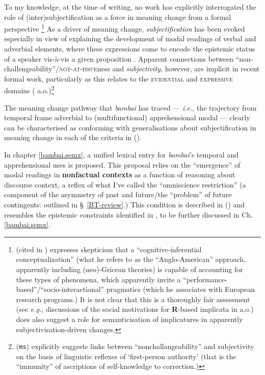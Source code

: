 \noindent To my knowledge, at the time of writing, no work has explicitly interrogated the role of (inter)subjectification as a force in meaning change from a formal perspective \citetext{\citeauthor{Eckardt2006} acknowledges this in her \citeyear{Eckardt2006} monograph (239).}\footnote{\citet{Jucker2012} (cited in \citealt[562]{Traugott2012}) expresses skepticism that a ``cognitive-inferential conceptualization'' (what he refers to as the ``Anglo-American'' approach, apparently including (neo)-Gricean theories) is capable of accounting for these types of phenomena, which apparently invite a ``performance-based''/``socio-interactional'' pragmatics (which he associates with European research programs.) It is not clear that this is a thoroughly fair assessment (see \textit{e.g.}, discussions of the social motivations for \textbf{R}-based implicata in \citealp{Horn1984,Horn1984a,Horn1993,Horn2007a} a.o.) \citet[43]{Eckardt2006} does also suggest a role for semanticisation of implicatures in apparently subjectivisation-driven changes.} As a driver of meaning change, \textit{subjectification} has been evoked especially in view of explaining the development of modal readings of verbal and adverbial elements, where these expressions come to encode the epistemic status of a speaker vis-à-vis a given proposition \citep{Finegan1995,Traugott1989,Traugott1995,Traugott2006,Traugott2003}.%
 Apparent connections between ``non-challengeability''/\textsc{not-at-issue}ness and \textit{subjectivity}, however, are implicit in recent formal work, particularly as this relates to the \textsc{evidential} and \textsc{expressive} domains (\citealp[\textit{e.g.},][]{Korotkova2016,Faller2002,Murray2014,Korotkova2020} a.o.)\footnote{\citeauthor{Korotkova-ms} (\texttt{ms}) explicitly suggests links between ``nonchallangeability'' and subjectivity on the basis of linguistic reflexes of `first-person authority' (that is the ``immunity'' of ascriptions of self-knowledge to correction.)}


 The meaning change pathway that \textit{bambai} has traced --- \textit{i.e.}, the trajectory from temporal frame adverbial to (multifunctional) apprehensional modal --- clearly can be characterised as conforming with generalisations about subjectification in meaning change in each of the criteria in ().

  In chapter \ref{bambai.semx}, a unified lexical entry for \textit{bambai}'s temporal and apprehensional uses is proposed. This proposal relies on the ``emergence'' of modal readings in \textbf{nonfactual contexts} as a function of reasoning about discourse context, a reflex of what I've called the ``omniscience restriction'' (a component of the asymmetry of past and future/the ``problem'' of future contingents: outlined in \S~\ref{BT-review}.) This condition is described in  () and resembles the epistemic constraints identified in \citet{Kaufmann2002}, to be further discussed in Ch. \ref{bambai.semx}.
  
